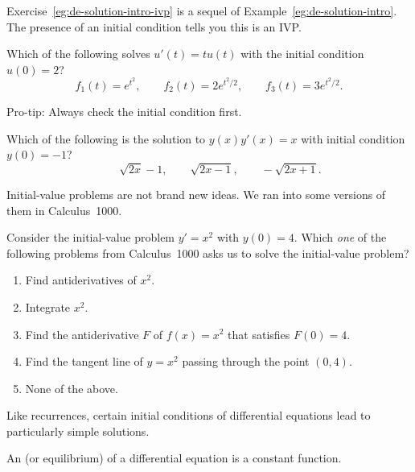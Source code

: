 \documentclass[../main.tex]{subfiles}
\begin{document}
Exercise~\ref{eg:de-solution-intro-ivp} is a sequel of Example~\ref{eg:de-solution-intro}.  The presence of an initial condition tells you this is an IVP.
\begin{exercise} \label{eg:de-solution-intro-ivp}
  Which of the following solves \(u'(t) = t u(t)\) with the initial condition \(u(0) = 2\)?
  \[
    f_{1}(t) = e^{t^{2}}, \qquad f_{2}(t) = 2e^{t^{2}/2}, \qquad f_{3}(t) = 3e^{t^{2}/2}.
  \]

\end{exercise}

Pro-tip: Always check the initial condition first.
\begin{exercise} \label{ex:de-ivp-check-first}
  Which of the following is the solution to \(y(x)y'(x) = x\) with initial condition \(y(0) = -1\)? 
  \[
    \qquad \sqrt{2x} - 1, \qquad \sqrt{2x - 1}, \qquad -\sqrt{2x + 1}.
  \]

  \blanks*
\end{exercise}
\clearpage

Initial-value problems are not brand new ideas. We ran into some versions of them in Calculus~1000.
\begin{example} \label{ex:diff-eq-IVP-calc-1000}
  Consider the initial-value problem \(y' = x^{2}\) with \(y(0) = 4\).  Which \emph{one} of the following problems from Calculus~1000 asks us to solve the initial-value problem?

  \begin{enumerate}[label=(\alph*)]
    \item Find antiderivatives of \(x^{2}\).
    \item Integrate \(x^{2}\).
    \item Find the antiderivative \(F\) of \(f(x) = x^{2}\) that satisfies \(F(0) = 4\).
    \item Find the tangent line of \(y = x^{2}\) passing through the point \((0,4)\).
    \item None of the above.
  \end{enumerate}

  \blanks*
\end{example}
\clearpage

Like recurrences, certain initial conditions of differential equations lead to particularly simple solutions. 

\begin{definition} \label{def:diff-eq-equilibrium}
  An  (or equilibrium) of a differential equation is a constant function.  
\end{definition}
\end{document}
